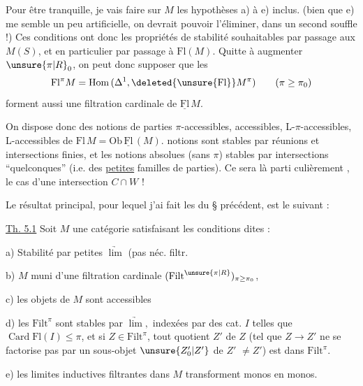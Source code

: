 Pour être tranquille, je vais faire sur $M$ les hypothèses a) à e) inclus. (bien que e) me semble un peu artificielle, on devrait pouvoir l'éliminer, dans un second souffle !) Ces conditions ont donc les propriétés de stabilité souhaitables par passage aux $M(S)$, et en particulier par passage à $\mathrm{Fl}(M)$. Quitte à augmenter $\unsure{\pi|R}_0$, on peut donc supposer que les
\[
 \mathrm{Fl}^{\pi}M=\mathrm{Hom}\,(\Delta^1,\deleted{\unsure{\mathrm{Fl}}}M^{\pi})
 \qquad(\pi\geq\pi_0)
\]
forment aussi une filtration cardinale de $\underline{\mathrm{Fl}}\,M$. 

On dispose donc des notions de parties $\pi$-accessibles, accessibles, L-$\pi$-accessibles, L-accessibles de $\mathrm{Fl}\,M=\mathrm{Ob}\,\underline{\mathrm{Fl}}\,(M)$.   notions sont stables par réunions et intersections finies, et les notions absolues (sans $\pi$) stables par intersections ``quelconques'' (i.e.   des  \uline{petites} familles de parties). Ce sera là  parti%
%
%
culièrement , le cas d'une intersection $C\cap W$ !

Le résultat principal, pour lequel j'ai fait les  du § précédent, est le suivant :

\uline{Th. 5.1} Soit $M$ une catégorie satisfaisant les conditions dites :

 a) Stabilité par petites $\underrightarrow{\lim}$ (pas néc. filtr.

b) $M$ muni d'une filtration cardinale $(\mathrm{Filt}^{\unsure{\pi|R}})_{\pi\geq\pi_0}$,

c) les objets de $M$ sont accessibles

d) les $\mathrm{Filt}^\pi$ sont stables par $\underrightarrow{\lim}\!,$ indexées par des cat. $I$ telles que $\operatorname{Card}\mathrm{Fl}(I)\leq\pi$, et si $Z\in\mathrm{Filt}^\pi$, tout quotient $Z'$ de $Z$ (tel que $Z\longrightarrow Z'$ ne se factorise pas par un sous-objet $\unsure{Z'_0|Z'}$ de $Z'$ $\ne Z'$) est dans $\mathrm{Filt}^\pi$.

e) les limites inductives filtrantes dans $M$ transforment monos en monos.

